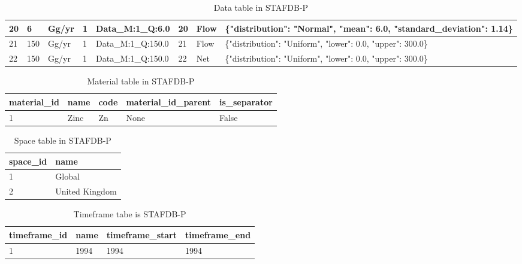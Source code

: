 \documentclass[ %
                    author={Tom Jager},
                supervisor={Dr. Daniel Schien},
                    degree={MEng},
                     title={A Bayesian Inference Engine for Calibrating Uncertainty over UMIS Structured MFA Systems},
                  subtitle={},
                      type={research},
                      year={2019} ]{dissertation}
\begin{document}
\begin{table}[]
\begin{tabular}{|l|l|l|l|l|l|p{1.1cm}|p{5cm}|}
20                & 6                 & Gg/yr         & 1                     & Data\_M:1\_Q:6.0   & 20                & Flow                 & \{"distribution": "Normal", "mean": 6.0, "standard\_deviation": 1.14\}   \\ \hline
21                & 150               & Gg/yr         & 1                     & Data\_M:1\_Q:150.0 & 21                & Flow                 & \{"distribution": "Uniform", "lower": 0.0, "upper": 300.0\}              \\ \hline
22                & 150               & Gg/yr         & 1                     & Data\_M:1\_Q:150.0 & 22                & Net                  & \{"distribution": "Uniform", "lower": 0.0, "upper": 300.0\}              \\ \hline
\end{tabular}
\caption{Data table in STAFDB-P}
\end{table}

\begin{table}[]
\center
\begin{tabular}{|l|l|l|l|l|}
\hline
\textbf{material\_id} & \textbf{name} & \textbf{code} & \textbf{material\_id\_parent} & \textbf{is\_separator} \\ \hline
1                     & Zinc          & Zn            & None                          & False                  \\ \hline
\end{tabular}
\caption{Material table in STAFDB-P}
\end{table}

\begin{table}[]
\center
\begin{tabular}{|l|l|}
\hline
\textbf{space\_id} & \textbf{name}  \\ \hline
1                  & Global         \\ \hline
2                  & United Kingdom \\ \hline
\end{tabular}
\caption{Space table in STAFDB-P}
\end{table}

\begin{table}[]
\center
\begin{tabular}{|l|l|l|l|}
\hline
\textbf{timeframe\_id} & \textbf{name} & \textbf{timeframe\_start} & \textbf{timeframe\_end} \\ \hline
1                     & 1994          & 1994                      & 1994                    \\ \hline
\end{tabular}
\caption{Timeframe tabe is STAFDB-P}
\end{table}
\end{document}
